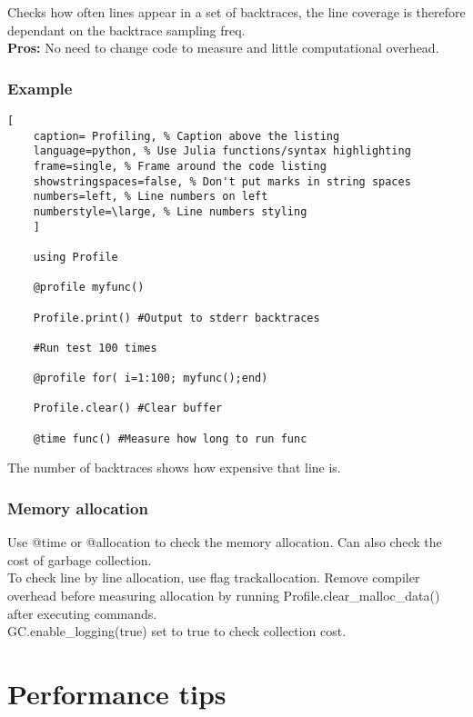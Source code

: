 \documentclass[11pt]{scrartcl} %
\begin{document}
Checks how often lines appear in a set of backtraces, the line coverage is therefore dependant on
the backtrace sampling freq.\\

\textbf{Pros:} No need to change code to measure and little computational overhead.

\subsubsection{Example}

\begin{lstlisting}[
	caption= Profiling, % Caption above the listing
	language=python, % Use Julia functions/syntax highlighting
	frame=single, % Frame around the code listing
	showstringspaces=false, % Don't put marks in string spaces
	numbers=left, % Line numbers on left
	numberstyle=\large, % Line numbers styling
	]

	using Profile

	@profile myfunc()

	Profile.print() #Output to stderr backtraces

	#Run test 100 times

	@profile for( i=1:100; myfunc();end)

	Profile.clear() #Clear buffer

	@time func() #Measure how long to run func

\end{lstlisting}

The number of backtraces shows how expensive that line is.

\subsubsection{Memory allocation}

Use @time or @allocation to check the memory allocation. Can also check the
cost of garbage collection.\\

To check line by line allocation, use flag track\-allocation. Remove compiler
overhead before measuring allocation by running Profile.clear\_malloc\_data() after
executing commands.\\

GC.enable\_logging(true) set to true to check collection cost.

\newpage
\section{Performance tips}
\end{document}
